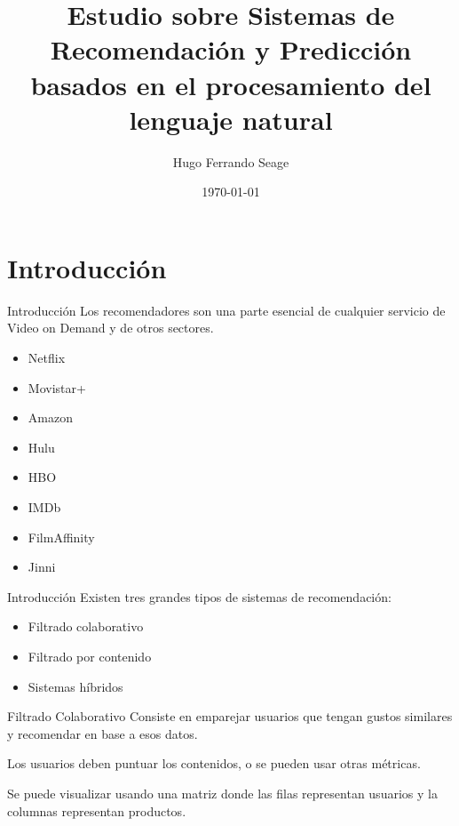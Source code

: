 \documentclass[table]{beamer}
\title{Estudio sobre Sistemas de Recomendación y Predicción basados en el procesamiento del lenguaje natural}
\date{\today}
\author{Hugo Ferrando Seage}
\institute{Universidad Europea de Madrid\\Escuela de Arquitectura, Ingeniería y Diseño}
\begin{document}
  \maketitle

  \section{Introducción}
  \begin{frame}[fragile]{Introducción}
      Los recomendadores son una parte esencial de cualquier servicio de Video on Demand y de otros sectores.

      \begin{multicols}{2}
          \begin{itemize}
              \item Netflix
              \item Movistar+
              \item Amazon
              \item Hulu
              \item HBO
              \item IMDb
              \item FilmAffinity
              \item Jinni
          \end{itemize}
      \end{multicols}
  \end{frame}

  \begin{frame}{Introducción}
      Existen tres grandes tipos de sistemas de recomendación:
      \begin{itemize}
          \item Filtrado colaborativo
          \item Filtrado por contenido
          \item Sistemas híbridos
      \end{itemize}
  \end{frame}

  \begin{frame}{Filtrado Colaborativo}
      Consiste en emparejar usuarios que tengan gustos similares y recomendar en base a esos datos.

      Los usuarios deben puntuar los contenidos, o se pueden usar otras métricas.

      Se puede visualizar usando una matriz donde las filas representan usuarios y la columnas representan productos.
  \end{frame}
\end{document}
